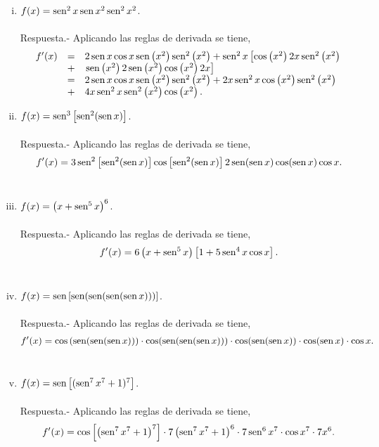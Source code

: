 \begin{enumerate}[\bfseries 1.]
\begin{enumerate}[(i)]
	    \item $f(x)=\sen^2 x \sen x^2\sen^2 x^2$.\\\\
		Respuesta.-\; Aplicando las reglas de derivada se tiene,
		$$\begin{array}{rcl}
		    f'(x)&=&2\sen x \cos x \sen\left(x^2\right)\sen^2\left(x^2\right)+\sen^2 x \left[\cos\left(x^2\right)2x\sen^2\left(x^2\right)\right.\\
			 &+&\left.\sen\left(x^2\right)2\sen\left(x^2\right)\cos\left(x^2\right)2x\right]\\
			 &=&2\sen x \cos x \sen\left(x^2\right)\sen^2\left(x^2\right)+2x\sen^2 x\cos\left(x^2\right)\sen^2\left(x^2\right)\\
			 &+&4x\sen^2 x \sen^2\left(x^2\right)\cos\left(x^2\right).\\
		\end{array}$$
		\vspace{0.7cm}

	    \item $f(x)=\sen^3\left[\sen^2(\sen x)\right]$.\\\\
		Respuesta.-\; Aplicando las reglas de derivada se tiene,
		    $$f'(x)=3\sen^2\left[\sen^2(\sen x)\right]\cos\left[\sen^2(\sen x)\right]2\sen(\sen x)\cos(\sen x)\cos x.$$\\

	    \item $f(x)=\left(x+\sen^5 x\right)^6$.\\\\
		Respuesta.-\; Aplicando las reglas de derivada se tiene,
		$$f'(x)=6\left(x+\sen^5 x\right)\left[1+5\sen^4 x \cos x\right].$$\\

	    \item $f(x)=\sen\left[\sen(\sen(\sen(\sen x)))\right]$.\\\\
		Respuesta.-\; Aplicando las reglas de derivada se tiene,
		$$f'(x)=\cos\left(\sen(\sen (\sen x))\right)\cdot \cos (\sen (\sen (\sen x)))\cdot \cos (\sen (\sen x))\cdot \cos (\sen x)\cdot \cos x.$$\\

	    \item $f(x)=\sen\left[(\sen^7 x^7 + 1)^7\right]$.\\\\
		Respuesta.-\; Aplicando las reglas de derivada se tiene,
		$$f'(x)=\cos\left[\left(\sen^7 x^7 + 1\right)^7\right]\cdot 7\left(\sen^7 x^7 + 1\right)^6\cdot 7\sen^6 x^7 \cdot \cos x^7 \cdot 7x^6.$$\\


\end{enumerate}
\end{enumerate}
